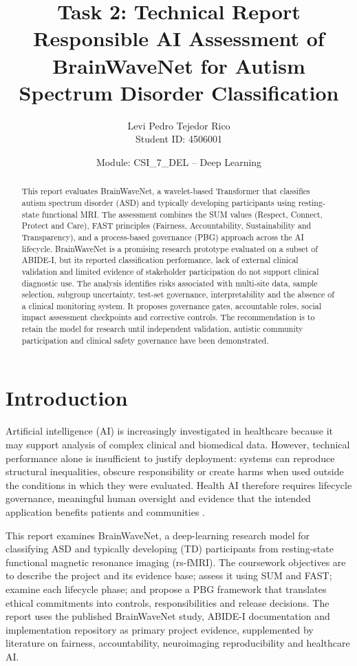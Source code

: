 \documentclass[11pt,a4paper]{article}
\title{\textbf{Task 2: Technical Report}\\
\large Responsible AI Assessment of BrainWaveNet for Autism Spectrum Disorder Classification}
\author{Levi Pedro Tejedor Rico\\Student ID: 4506001}
\date{Module: CSI\_7\_DEL -- Deep Learning}
\begin{document}
\maketitle

\begin{abstract}
This report evaluates BrainWaveNet, a wavelet-based Transformer that classifies autism spectrum disorder (ASD) and typically developing participants using resting-state functional MRI. The assessment combines the SUM values (Respect, Connect, Protect and Care), FAST principles (Fairness, Accountability, Sustainability and Transparency), and a process-based governance (PBG) approach across the AI lifecycle. BrainWaveNet is a promising research prototype evaluated on a subset of ABIDE-I, but its reported classification performance, lack of external clinical validation and limited evidence of stakeholder participation do not support clinical diagnostic use. The analysis identifies risks associated with multi-site data, sample selection, subgroup uncertainty, test-set governance, interpretability and the absence of a clinical monitoring system. It proposes governance gates, accountable roles, social impact assessment checkpoints and corrective controls. The recommendation is to retain the model for research until independent validation, autistic community participation and clinical safety governance have been demonstrated.
\end{abstract}

\tableofcontents
\newpage

\section{Introduction}
Artificial intelligence (AI) is increasingly investigated in healthcare because it may support analysis of complex clinical and biomedical data. However, technical performance alone is insufficient to justify deployment: systems can reproduce structural inequalities, obscure responsibility or create harms when used outside the conditions in which they were evaluated. Health AI therefore requires lifecycle governance, meaningful human oversight and evidence that the intended application benefits patients and communities \parencite{who2021,rajkomar2018,leslie2019}.

This report examines BrainWaveNet, a deep-learning research model for classifying ASD and typically developing (TD) participants from resting-state functional magnetic resonance imaging (rs-fMRI). The coursework objectives are to describe the project and its evidence base; assess it using SUM and FAST; examine each lifecycle phase; and propose a PBG framework that translates ethical commitments into controls, responsibilities and release decisions. The report uses the published BrainWaveNet study, ABIDE-I documentation and implementation repository as primary project evidence, supplemented by literature on fairness, accountability, neuroimaging reproducibility and healthcare AI.
\end{document}
